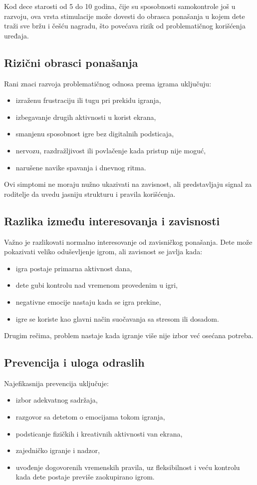\documentclass[a4paper,12pt]{article}
\begin{document}
Kod dece starosti od 5 do 10 godina, čije su sposobnosti samokontrole još u razvoju, ova vrsta stimulacije može dovesti do obrasca ponašanja u kojem dete traži sve bržu i češću nagradu, što povećava rizik od problematičnog korišćenja uređaja.

\subsection*{Rizični obrasci ponašanja}
Rani znaci razvoja problematičnog odnosa prema igrama uključuju:
\begin{itemize}
    \item izraženu frustraciju ili tugu pri prekidu igranja,
    \item izbegavanje drugih aktivnosti u korist ekrana,
    \item smanjenu sposobnost igre bez digitalnih podsticaja,
    \item nervozu, razdražljivost ili povlačenje kada pristup nije moguć,
    \item narušene navike spavanja i dnevnog ritma.
\end{itemize}

Ovi simptomi ne moraju nužno ukazivati na zavisnost, ali predstavljaju signal za roditelje da uvedu jasniju strukturu i pravila korišćenja.

\subsection*{Razlika između interesovanja i zavisnosti}
Važno je razlikovati normalno interesovanje od zavisničkog ponašanja.  
Dete može pokazivati veliko oduševljenje igrom, ali zavisnost se javlja kada:
\begin{itemize}
    \item igra postaje primarna aktivnost dana,
    \item dete gubi kontrolu nad vremenom provedenim u igri,
    \item negativne emocije nastaju kada se igra prekine,
    \item igre se koriste kao glavni način suočavanja sa stresom ili dosadom.
\end{itemize}

Drugim rečima, problem nastaje kada igranje više nije izbor već osećana potreba.

\subsection*{Prevencija i uloga odraslih}
Najefikasnija prevencija uključuje:
\begin{itemize}
    \item izbor adekvatnog sadržaja,
    \item razgovor sa detetom o emocijama tokom igranja,
    \item podsticanje fizičkih i kreativnih aktivnosti van ekrana,
    \item zajedničko igranje i nadzor,
    \item uvođenje dogovorenih vremenskih pravila, uz fleksibilnost i veću kontrolu kada dete postaje previše zaokupirano igrom.
\end{itemize}
\end{document}
